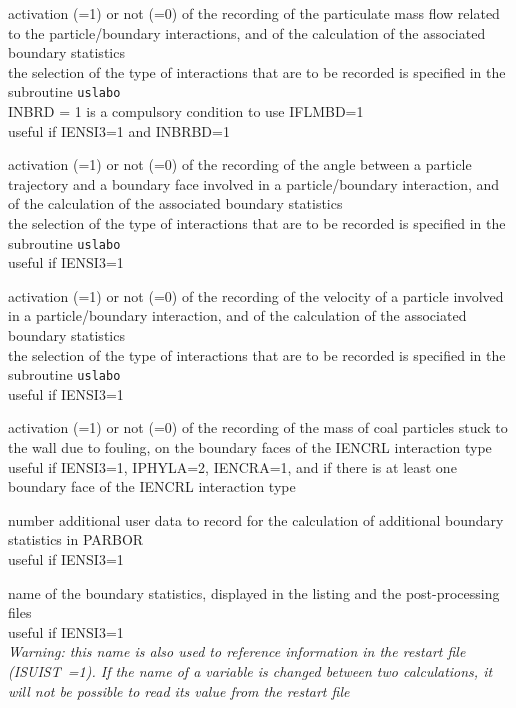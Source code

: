{activation (=1) or not (=0) of the recording of the particulate mass flow
related to the particle/boundary interactions, and of the calculation of
the associated boundary statistics\\
the selection of the type of interactions that are to be recorded is specified
in the subroutine \texttt{uslabo}\\
INBRD = 1 is a compulsory condition to use IFLMBD=1\\
useful if IENSI3=1 and INBRBD=1}


{activation (=1) or not (=0) of the recording of the angle between a
particle trajectory and a boundary face involved in a particle/boundary
interaction, and of the calculation of the associated boundary statistics\\
the selection of the type of interactions that are to be recorded is specified
in the subroutine \texttt{uslabo}\\
useful if IENSI3=1}

{activation (=1) or not (=0) of the recording of the velocity of a particle
involved in a particle/boundary interaction, and of the calculation of
the associated boundary statistics\\
the selection of the type of interactions that are to be recorded is specified
in the subroutine \texttt{uslabo}\\
useful if IENSI3=1}

{activation (=1) or not (=0) of the recording of the mass of coal particles
stuck to the wall due to fouling, on the boundary faces of the IENCRL
interaction type\\
useful if IENSI3=1, IPHYLA=2,
IENCRA=1, and if there is at least one boundary face of the IENCRL interaction
type}

{number additional user data to record for the calculation
of additional boundary statistics in PARBOR\\
useful if IENSI3=1}

{name of the boundary statistics, displayed in the listing
and the post-processing files\\
useful if IENSI3=1\\
{\em Warning: this name is also used to reference information in the restart file
\mbox{(ISUIST =1)}. If the name of a variable is changed between two
calculations, it will not be possible to read its value from the restart file}}

